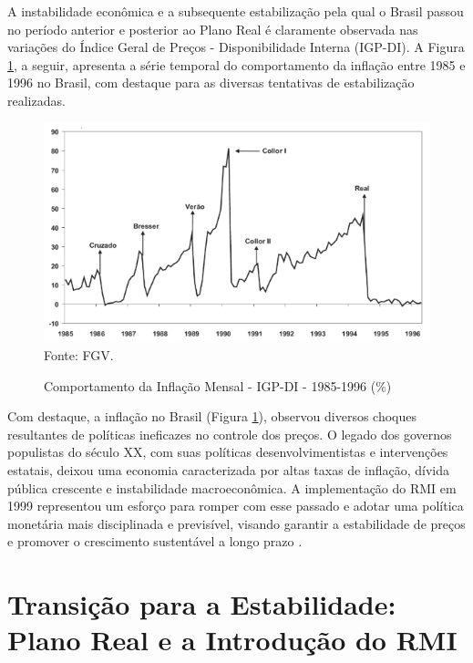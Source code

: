 \documentclass[12pt,oneside,a4paper,chapter=TITLE,english,brazil,sumario=abnt-6027-2012]{abntex2}
\begin{document}
A instabilidade econômica e a subsequente estabilização pela qual o Brasil passou no período anterior e posterior ao Plano Real é claramente observada nas variações do Índice Geral de Preços - Disponibilidade Interna (IGP-DI). A Figura \ref{fig:igpdi}, a seguir, apresenta a série temporal do comportamento da inflação entre 1985 e 1996 no Brasil, com destaque para as diversas tentativas de estabilização realizadas.

\begin{figure}[H]
	
	\caption{Comportamento da Inflação Mensal - IGP-DI - 1985-1996 (\%)}
	
	\includegraphics[]{fig/igp-di.png}\\
	
	\footnotesize Fonte: FGV.
	
	\label{fig:igpdi}
	
\end{figure}

Com destaque, a inflação no Brasil (Figura \ref{fig:igpdi}), observou diversos choques resultantes de políticas ineficazes no controle dos preços. O legado dos governos populistas do século XX, com suas políticas desenvolvimentistas e intervenções estatais, deixou uma economia caracterizada por altas taxas de inflação, dívida pública crescente e instabilidade macroeconômica. A implementação do RMI em 1999 representou um esforço para romper com esse passado e adotar uma política monetária mais disciplinada e previsível, visando garantir a estabilidade de preços e promover o crescimento sustentável a longo prazo \cite{amaurypatrickgremaud_2009_economia}.

\section{Transição para a Estabilidade: Plano Real e a Introdução do RMI}
\end{document}
